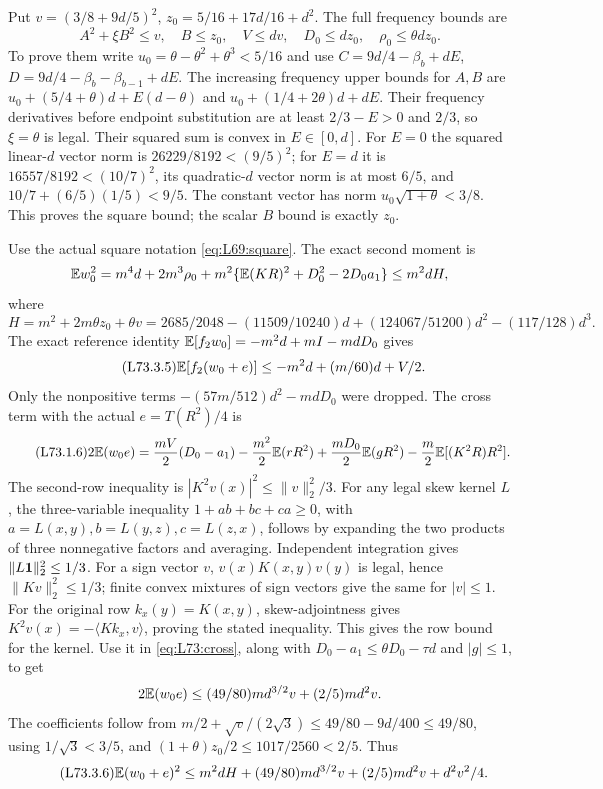 Put $v=(3/8+9d/5)^2$, $z_0=5/16+17d/16+d^2$.
The full frequency bounds are
\begin{equation}\tag{L73.3.3}\label{eq:L73:vector}
A^2+\xi B^2\le v,\quad B\le z_0,\quad V\le dv,
\quad D_0\le dz_0,\quad\rho_0\le\theta dz_0.
\end{equation}
To prove them write $u_0=\theta-\theta^2+\theta^3<5/16$ and use
$C=9d/4-\beta_b+dE$,
$D=9d/4-\beta_b-\beta_{b-1}+dE$.
The increasing frequency upper bounds for $A,B$ are
$u_0+(5/4+\theta)d+E(d-\theta)$ and
$u_0+(1/4+2\theta)d+dE$.
Their frequency derivatives before endpoint substitution are at least
$2/3-E>0$ and $2/3$, so $\xi=\theta$ is legal.
Their squared sum is convex in $E\in[0,d]$.
For $E=0$ the squared linear-$d$ vector norm is
$26229/8192<(9/5)^2$; for $E=d$ it is
$16557/8192<(10/7)^2$, its quadratic-$d$ vector norm is at most
$6/5$, and $10/7+(6/5)(1/5)<9/5$.
The constant vector has norm $u_0\sqrt{1+\theta}<3/8$.
This proves the square bound; the scalar $B$ bound is exactly $z_0$.

Use the actual square notation \eqref{eq:L69:square}.
The exact second moment is
\[
\mathbb E w_0^2=m^4d+2m^3\rho_0
+m^2\{\mathbb E(KR)^2+D_0^2-2D_0a_1\}\le m^2dH,
\]
where
\begin{equation}\tag{L73.3.4}\label{eq:L73:H}
H=m^2+2m\theta z_0+\theta v
=2685/2048-(11509/10240)d+(124067/51200)d^2-(117/128)d^3.
\end{equation}
The exact reference identity
$\mathbb E[f_2w_0]=-m^2d+mI-mdD_0$ gives
\begin{equation}\tag{L73.3.5}\label{eq:L73:first}
\mathbb E[f_2(w_0+e)]\le-m^2d+(m/60)d+V/2.
\end{equation}
Only the nonpositive terms $-(57m/512)d^2-mdD_0$ were dropped.
The cross term with the actual $e=T(R^2)/4$ is
\begin{equation}\tag{L73.1.6}\label{eq:L73:cross}
2\mathbb E(w_0e)=\frac{mV}{2}(D_0-a_1)
-\frac{m^2}{2}\mathbb E(rR^2)+\frac{mD_0}{2}\mathbb E(gR^2)
-\frac m2\mathbb E[(K^2R)R^2].
\end{equation}
The second-row inequality is
$|K^2v(x)|^2\le\|v\|_2^2/3$.
For any legal skew kernel $L$, the three-variable inequality
$1+ab+bc+ca\ge0$, with
$a=L(x,y),b=L(y,z),c=L(z,x)$, follows by expanding the two products
of three nonnegative factors and averaging.
Independent integration gives $\|L\mathbf1\|_2^2\le1/3$.
For a sign vector $v$, $v(x)K(x,y)v(y)$ is legal, hence
$\|Kv\|_2^2\le1/3$; finite convex mixtures of sign vectors give
the same for $|v|\le1$.
For the original row $k_x(y)=K(x,y)$, skew-adjointness gives
$K^2v(x)=-\langle Kk_x,v\rangle$, proving the stated inequality.
This gives the row bound for the kernel.
Use it in \eqref{eq:L73:cross}, along with
$D_0-a_1\le\theta D_0-\tau d$ and $|g|\le1$, to get
\[
2\mathbb E(w_0e)\le(49/80)md^{3/2}v+(2/5)md^2v.
\]
The coefficients follow from
$m/2+\sqrt v/(2\sqrt3)\le49/80-9d/400\le49/80$,
using $1/\sqrt3<3/5$, and
$(1+\theta)z_0/2\le1017/2560<2/5$.
Thus
\begin{equation}\tag{L73.3.6}\label{eq:L73:variance}
\mathbb E(w_0+e)^2\le m^2dH+(49/80)md^{3/2}v
+(2/5)md^2v+d^2v^2/4.
\end{equation}

